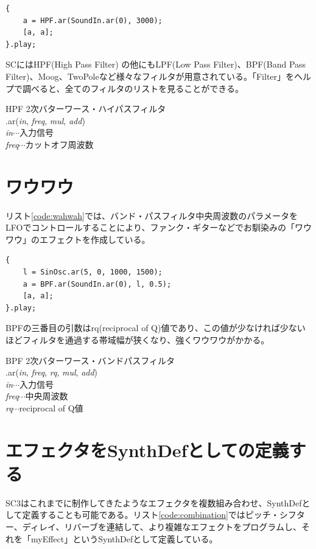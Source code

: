 \documentclass{jsarticle}
\begin{document}
\begin{lstlisting}[caption=ハイパス・フィルタ, label=code:highpass]
{
	a = HPF.ar(SoundIn.ar(0), 3000);
	[a, a];
}.play;
\end{lstlisting}

SCにはHPF(High Pass Filter) の他にもLPF(Low Pass Filter)、BPF(Band Pass Filter)、Moog、TwoPoleなど様々なフィルタが用意されている。「Filter」をヘルプで調べると、全てのフィルタのリストを見ることができる。

\begin{itembox}[l]{HPF}
{\footnotesize 
2次バターワース・ハイパスフィルタ\\
.ar({\it in}, {\it freq}, {\it mul}, {\it add})\\

{\it in}$\cdots$入力信号\\
{\it freq}$\cdots$カットオフ周波数\\
}
\end{itembox}

\section{ワウワウ}
リスト\ref{code:wahwah}では、バンド・パスフィルタ中央周波数のパラメータをLFOでコントロールすることにより、ファンク・ギターなどでお馴染みの「ワウワウ」のエフェクトを作成している。
\begin{lstlisting}[caption=ワウワウ, label=code:wahwah]
{
	l = SinOsc.ar(5, 0, 1000, 1500);
	a = BPF.ar(SoundIn.ar(0), l, 0.5);
	[a, a];
}.play;
\end{lstlisting}

BPFの三番目の引数はrq(reciprocal of Q)値であり、この値が少なければ少ないほどフィルタを通過する帯域幅が狭くなり、強くワウワウがかかる。

\begin{itembox}[l]{BPF}
{\footnotesize 
2次バターワース・バンドパスフィルタ\\
.ar({\it in}, {\it freq}, {\it rq}, {\it mul}, {\it add})\\

{\it in}$\cdots$入力信号\\
{\it freq}$\cdots$中央周波数\\
{\it rq}$\cdots$reciprocal of Q値\\
}
\end{itembox}

\section{エフェクタをSynthDefとしての定義する}
SC3はこれまでに制作してきたようなエフェクタを複数組み合わせ、SynthDefとして定義することも可能である。リスト\ref{code:combination}ではピッチ・シフター、ディレイ、リバーブを連結して、より複雑なエフェクトをプログラムし、それを「myEffect」というSynthDefとして定義している。
\end{document}
